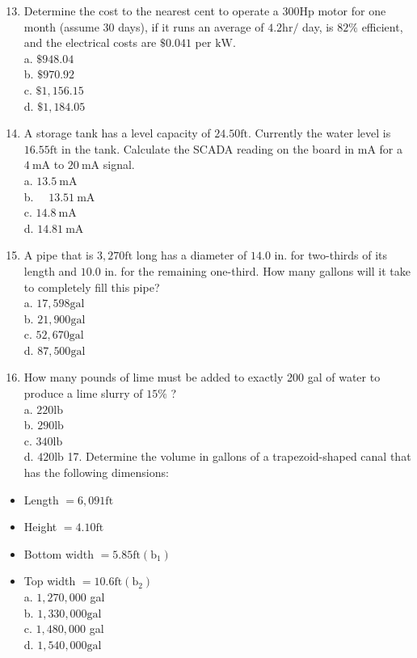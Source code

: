 \documentclass[10pt]{article}
\begin{document}
\begin{enumerate}
  \setcounter{enumi}{12}
  \item Determine the cost to the nearest cent to operate a $300 \mathrm{Hp}$ motor for one month (assume 30 days), if it runs an average of $4.2 \mathrm{hr} /$ day, is $82 \%$ efficient, and the electrical costs are $\$ 0.041$ per $\mathrm{kW}$.\\
a. $\$ 948.04$\\
b. $\$ 970.92$\\
c. $\$ 1,156.15$\\
d. $\$ 1,184.05$

  \item A storage tank has a level capacity of $24.50 \mathrm{ft}$. Currently the water level is $16.55 \mathrm{ft}$ in the tank. Calculate the SCADA reading on the board in $\mathrm{mA}$ for a $4 \mathrm{~mA}$ to $20 \mathrm{~mA}$ signal.\\
a. $13.5 \mathrm{~mA}$\\
b. $\quad 13.51 \mathrm{~mA}$\\
c. $14.8 \mathrm{~mA}$\\
d. $14.81 \mathrm{~mA}$

  \item A pipe that is $3,270 \mathrm{ft}$ long has a diameter of $14.0$ in. for two-thirds of its length and $10.0$ in. for the remaining one-third. How many gallons will it take to completely fill this pipe?\\
a. $17,598 \mathrm{gal}$\\
b. $21,900 \mathrm{gal}$\\
c. $52,670 \mathrm{gal}$\\
d. $87,500 \mathrm{gal}$

  \item How many pounds of lime must be added to exactly 200 gal of water to produce a lime slurry of $15 \%$ ?\\
a. $220 \mathrm{lb}$\\
b. $290 \mathrm{lb}$\\
c. $340 \mathrm{lb}$\\
d. $420 \mathrm{lb}$ 17. Determine the volume in gallons of a trapezoid-shaped canal that has the following dimensions:

\end{enumerate}

\begin{itemize}
  \item Length $=6,091 \mathrm{ft}$

  \item Height $=4.10 \mathrm{ft}$

  \item Bottom width $=5.85 \mathrm{ft}\left(\mathrm{b}_{1}\right)$

  \item Top width $=10.6 \mathrm{ft}\left(\mathrm{b}_{2}\right)$\\
a. $1,270,000$ gal\\
b. $1,330,000 \mathrm{gal}$\\
c. $1,480,000$ gal\\
d. $1,540,000 \mathrm{gal}$

\end{itemize}
\end{document}
